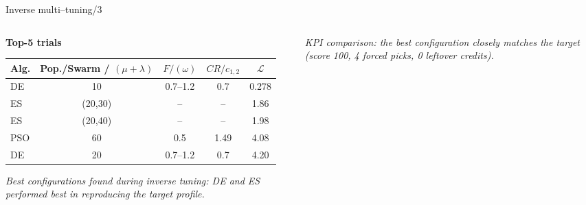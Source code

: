 \documentclass[aspectratio=169]{beamer}
\begin{document}
\begin{frame}{Inverse multi–tuning/3}
	\small
	\vspace{1ex}
	\centering
	
	\begin{columns}[T,onlytextwidth]
		\begin{column}{.55\linewidth}
			\textbf{Top-5 trials}\par\medskip
			\footnotesize
			\begin{tabular}{@{}lcccc@{}}
				\toprule
				Alg. & Pop./Swarm / $(\mu + \lambda)$ & $F/(\omega)$ & $CR/c_{1,2}$ & $\mathcal L$\\
				\midrule
				DE  & 10          & 0.7–1.2 & 0.7  & 0.278\\
				ES  & (20,30)     & –       & –    & 1.86\\
				ES  & (20,40)     & –       & –    & 1.98\\
				PSO & 60          & 0.5     & 1.49 & 4.08\\
				DE  & 20          & 0.7–1.2 & 0.7  & 4.20\\
				\bottomrule
			\end{tabular}
			
			\vspace{1ex}
			\textit{Best configurations found during inverse tuning: DE and ES performed best in reproducing the target profile.}
		\end{column}
		
		\begin{column}{.45\linewidth}
			
			\vspace{1ex}
			\textit{KPI comparison: the best configuration closely matches the target (score 100, 4 forced picks, 0 leftover credits).}
		\end{column}
	\end{columns}
\end{frame}
\end{document}
